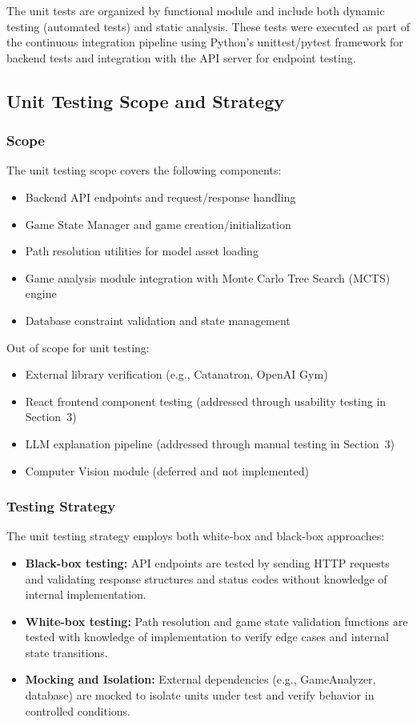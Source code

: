 \documentclass[12pt, titlepage]{article}
\begin{document}
The unit tests are organized by functional module and include both dynamic testing (automated tests) and static analysis. These tests were executed as part of the continuous integration pipeline using Python's unittest/pytest framework for backend tests and integration with the API server for endpoint testing.

\subsection{Unit Testing Scope and Strategy}

\subsubsection{Scope}

The unit testing scope covers the following components:
\begin{itemize}
    \item Backend API endpoints and request/response handling
    \item Game State Manager and game creation/initialization
    \item Path resolution utilities for model asset loading
    \item Game analysis module integration with Monte Carlo Tree Search (MCTS) engine
    \item Database constraint validation and state management
\end{itemize}

Out of scope for unit testing:
\begin{itemize}
    \item External library verification (e.g., Catanatron, OpenAI Gym)
    \item React frontend component testing (addressed through usability testing in Section~3)
    \item LLM explanation pipeline (addressed through manual testing in Section~3)
    \item Computer Vision module (deferred and not implemented)
\end{itemize}

\subsubsection{Testing Strategy}

The unit testing strategy employs both white-box and black-box approaches:
\begin{itemize}
    \item \textbf{Black-box testing:} API endpoints are tested by sending HTTP requests and validating response structures and status codes without knowledge of internal implementation.
    \item \textbf{White-box testing:} Path resolution and game state validation functions are tested with knowledge of implementation to verify edge cases and internal state transitions.
    \item \textbf{Mocking and Isolation:} External dependencies (e.g., GameAnalyzer, database) are mocked to isolate units under test and verify behavior in controlled conditions.
\end{itemize}
\end{document}
